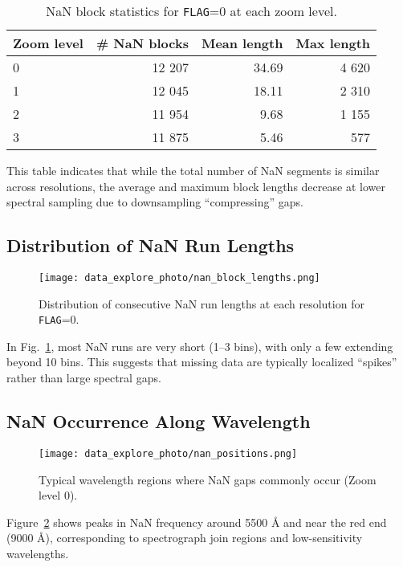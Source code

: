 \documentclass[english,bachelor,oneside]{ctufit-thesis}
\begin{document}
\begin{table}[H]
  \centering
  \caption{NaN block statistics for \texttt{FLAG}=0 at each zoom level.}
  \label{tab:nan_blocks}
  \begin{tabular}{@{}lrrr@{}}
    \toprule
    Zoom level & \# NaN blocks & Mean length & Max length \\
    \midrule
    0 & 12 207 & 34.69 & 4 620 \\
    1 & 12 045 & 18.11 & 2 310 \\
    2 & 11 954 &  9.68 & 1 155 \\
    3 & 11 875 &  5.46 &   577 \\
    \bottomrule
  \end{tabular}
\end{table}

This table indicates that while the total number of NaN segments is similar across resolutions, the average and maximum block lengths decrease at lower spectral sampling due to downsampling “compressing” gaps.


\subsection{Distribution of NaN Run Lengths}
\begin{figure}[H]
    \centering
    \texttt{[image: data\_explore\_photo/nan\_block\_lengths.png]}
    \caption{Distribution of consecutive NaN run lengths at each resolution for \texttt{FLAG}=0.}
    \label{fig:nan_block_lengths}
\end{figure}
\noindent
 In Fig.~\ref{fig:nan_block_lengths}, most NaN runs are very short (1–3 bins), with only a few extending beyond 10 bins. This suggests that missing data are typically localized “spikes” rather than large spectral gaps.


\subsection{NaN Occurrence Along Wavelength}
\begin{figure}[H]
    \centering
    \texttt{[image: data\_explore\_photo/nan\_positions.png]}
    \caption{Typical wavelength regions where NaN gaps commonly occur (Zoom level 0).}
    \label{fig:nan_positions}
\end{figure}
\noindent
Figure~\ref{fig:nan_positions} shows peaks in NaN frequency around 5500 Å and near the red end (9000 Å), corresponding to spectrograph join regions and low-sensitivity wavelengths.  
\end{document}

